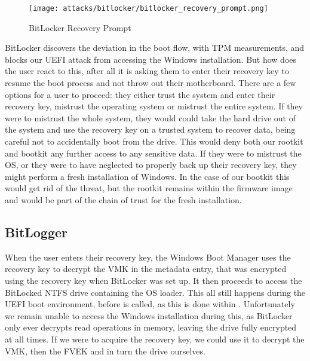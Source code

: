 \begin{figure}[htb]
    \centering
    \texttt{[image: attacks/bitlocker/bitlocker\_recovery\_prompt.png]}
    \caption{BitLocker Recovery Prompt}
    \label{fig:bitlocker-recovery-prompt}
\end{figure}

BitLocker discovers the deviation in the boot flow, with \ac{TPM} measurements, and blocks our \ac{UEFI} attack from accessing the Windows installation.
But how does the user react to this, after all it is asking them to enter their recovery key to resume the boot process and not throw out their motherboard.
There are a few options for a user to proceed: they either trust the system and enter their recovery key, mistrust the operating system or mistrust the entire system.
If they were to mistrust the whole system, they would could take the hard drive out of the system and use the recovery key on a trusted system to recover data, being careful not to accidentally boot from the drive.
This would deny both our rootkit and bootkit any further access to any sensitive data.
If they were to mistrust the \ac{OS}, or they were to have neglected to properly back up their recovery key, they might perform a fresh installation of Windows.
In the case of our bootkit this would get rid of the threat, but the rootkit remains within the firmware image and would be part of the chain of trust for the fresh installation.

\subsection{BitLogger}

When the user enters their recovery key, the Windows Boot Manager uses the recovery key to decrypt the \ac{VMK} in the metadata entry, that was encrypted using the recovery key when BitLocker was set up.
It then proceeds to access the BitLocked \ac{NTFS} drive containing the  \ac{OS} loader.
This all still happens during the \ac{UEFI} boot environment, before  is called, as this is done within .
Unfortunately we remain unable to access the Windows installation during this, as BitLocker only ever decrypts read operations in memory, leaving the drive fully encrypted at all times.
If we were to acquire the recovery key, we could use it to decrypt the \ac{VMK}, then the \ac{FVEK} and in turn the drive ourselves.

